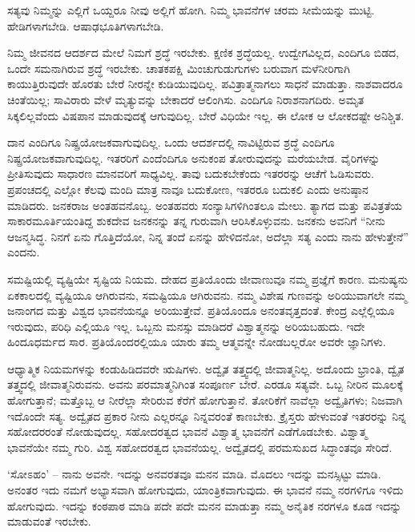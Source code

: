 ಸತ್ಯವು ನಿಮ್ಮನ್ನು ಎಲ್ಲಿಗೆ ಒಯ್ದರೂ ನೀವು ಅಲ್ಲಿಗೆ ಹೋಗಿ. ನಿಮ್ಮ ಭಾವನೆಗಳ ಚರಮ ಸೀಮೆಯನ್ನು ಮುಟ್ಟಿ. ಹೇಡಿಗಳಾಗಬೇಡಿ. ಆಷಾಢಭೂತಿಗಳಾಗಬೇಡಿ.

ನಿಮ್ಮ ಜೀವನದ ಆದರ್ಶದ ಮೇಲೆ ನಿಮಗೆ ಶ್ರದ್ಧೆ ಇರಬೇಕು. ಕ್ಷಣಿಕ ಶ್ರದ್ಧೆಯಲ್ಲ. ಉದ್ವೇಗವಿಲ್ಲದ, ಎಂದಿಗೂ ಬಿಡದ, ಒಂದೇ ಸಮನಾಗಿರುವ ಶ್ರದ್ಧೆ ಇರಬೇಕು. ಚಾತಕಪಕ್ಷಿ ಮಿಂಚುಗುಡುಗುಗಳು ಬರುವಾಗ ಮಳೆನೀರಿಗಾಗಿ ಕಾಯುತ್ತಿರುವುದೇ ಹೊರತು ಬೇರೆ ನೀರನ್ನೇ ಕುಡಿಯುವುದಿಲ್ಲ. ಪವಿತ್ರಾತ್ಮನಾಗಲು ಸಾಧನೆ ಮಾಡುತ್ತಾ. ನಾಶವಾದರೂ ಚಿಂತೆಯಿಲ್ಲ; ಸಾವಿರಾರು ವೇಳೆ ಮೃತ್ಯುವನ್ನು ಬೇಕಾದರೆ ಆಲಿಂಗಿಸು. ಎಂದಿಗೂ ನಿರಾಶನಾಗದಿರು. ಅಮೃತ ಸಿಕ್ಕಲಿಲ್ಲವೆಂದು ವಿಷಪಾನ ಮಾಡುವುದಕ್ಕೆ ಆಗುವುದಿಲ್ಲ. ಬೇರೆ ವಿಧಿಯೇ ಇಲ್ಲ. ಈ ಲೋಕ ಆ ಲೋಕದಷ್ಟೇ ಅನಿಶ್ಚಿತ.

ದಾನ ಎಂದಿಗೂ ನಿಷ್ಪ್ರಯೋಜಕವಾಗುವುದಿಲ್ಲ. ಒಂದು ಆದರ್ಶದಲ್ಲಿ ನಾವಿಟ್ಟಿರುವ ಶ್ರದ್ಧೆ ಎಂದಿಗೂ ನಿಷ್ಪ್ರಯೋಜಕವಾಗುವುದಿಲ್ಲ. ಇತರರಿಗೆ ಎಂದೆಂದಿಗೂ ಅನುಕಂಪ ತೋರುವುದನ್ನು ಮರೆಯಬೇಡ. ವೈರಿಗಳನ್ನು ಪ್ರೀತಿಸುವುದು ಸಾಧಾರಣ ಮಾನವರಿಗೆ ಸಾಧ್ಯವಿಲ್ಲ. ತಾವು ಬದುಕಬೇಕೆಂದು ಇತರರನ್ನು ಆಚೆಗೆ ಓಡಿಸುವರು. ಪ್ರಪಂಚದಲ್ಲಿ ಎಲ್ಲೋ ಕೆಲವು ಮಂದಿ ಮಾತ್ರ ನಾವೂ ಬದುಕೋಣ, ಇತರರೂ ಬದುಕಲಿ ಎಂದು ಅನುಷ್ಠಾನ ಮಾಡಿದರು. ಜನಕರಾಜ ಅಂತಹವನೊಬ್ಬ. ಅಂತಹವರು ಸಂನ್ಯಾಸಿಗಳಿಗಿಂತಲೂ ಮೇಲು. ತ್ಯಾಗದ ಮತ್ತು ಪವಿತ್ರತೆಯ ಸಾಕಾರಮೂರ್ತಿಯಂತಿದ್ದ ಶುಕದೇವ ಜನಕನನ್ನು ತನ್ನ ಗುರುವಾಗಿ ಆರಿಸಿಕೊಳ್ಳುವನು. ಜನಕನು ಅವನಿಗೆ “ನೀನು ಆಜನ್ಮಸಿದ್ಧ. ನಿನಗೆ ಏನು ಗೊತ್ತಿದೆಯೋ, ನಿನ್ನ ತಂದೆ ಏನನ್ನು ಹೇಳಿದನೋ, ಅದೆಲ್ಲಾ ಸತ್ಯ ಎಂದು ನಾನು ಹೇಳುತ್ತೇನೆ” ಎಂದನು.

ಸಮಷ್ಟಿಯಲ್ಲಿ ವ್ಯಷ್ಟಿಯೇ ಸೃಷ್ಟಿಯ ನಿಯಮ. ದೇಹದ ಪ್ರತಿಯೊಂದು ಜೀವಾಣುವೂ  ನಮ್ಮ ಪ್ರಜ್ಞೆಗೆ ಕಾರಣ. ಮನುಷ್ಯನು ಏಕಕಾಲದಲ್ಲಿ ವ್ಯಷ್ಟಿಯೂ ಆಗಿರುವನು, ಸಮಷ್ಟಿಯೂ ಆಗಿರುವನು. ನಮ್ಮ ವಿಶೇಷ ಗುಣವನ್ನು ಅರಿಯುವಾಗಲೇ ನಮ್ಮ ಜನಾಂಗದ ಮತ್ತು ವಿಶ್ವದ ಭಾವನೆಯನ್ನೂ ಅರಿಯುತ್ತೇವೆ. ಪ್ರತಿಯೊಂದೂ ಅನಂತವೃತ್ತದಂತೆ. ಕೇಂದ್ರ ಎಲ್ಲೆಲ್ಲಿಯೂ ಇರುವುದು, ಪರಿಧಿ ಎಲ್ಲಿಯೂ ಇಲ್ಲ. ಒಬ್ಬನು ಮನಸ್ಸು ಮಾಡಿದರೆ ವಿಶ್ವಾತ್ಮನನ್ನು ಅರಿಯಬಹುದು. ಇದೇ ಹಿಂದೂಧರ್ಮದ ಸಾರ. ಪ್ರತಿಯೊಂದರಲ್ಲಿಯೂ ಯಾರು ತಮ್ಮ ಆತ್ಮವನ್ನೇ ನೋಡಬಲ್ಲರೋ ಅವರೇ ಜ್ಞಾನಿಗಳು.

ಆಧ್ಯಾತ್ಮಿಕ ನಿಯಮಗಳನ್ನು ಕಂಡುಹಿಡಿದವರೇ ಋಷಿಗಳು. ಅದ್ವೈತ ತತ್ತ್ವದಲ್ಲಿ ಜೀವಾತ್ಮನಿಲ್ಲ. ಅದೊಂದು ಭ್ರಾಂತಿ, ದ್ವೈತ ತತ್ತ್ವದಲ್ಲಿ ಜೀವಾತ್ಮನಿರುವನು. ಅವನು ಪರಮಾತ್ಮನಿಗಿಂತ ಸಂಪೂರ್ಣ ಬೇರೆ. ಎರಡೂ ಸತ್ಯವೇ. ಒಬ್ಬ ನೀರಿನ ಮೂಲಕ್ಕೆ ಹೋಗುತ್ತಾನೆ; ಮತ್ತೊಬ್ಬ ಆ ನೀರೆಲ್ಲಾ ಸೇರಿರುವ ಕೆರೆಗೆ ಹೋಗುತ್ತಾನೆ. ತೋರಿಕೆಗೆ ನಾವೆಲ್ಲಾ ಅದ್ವೈತಿಗಳು; ನಿಜವಾಗಿ ಇದೊಂದೇ ಸತ್ಯ. ಅದ್ವೈತದ ಪ್ರಕಾರ ನೀನು ಎಲ್ಲರನ್ನೂ ನಿನ್ನವರಂತೆ ಕಾಣಬೇಕು. ಕ್ರೈಸ್ತರು ಹೇಳುವಂತೆ ಇತರರನ್ನು ನಿನ್ನ ಸಹೋದರರಂತೆ ನೋಡುವುದಲ್ಲ. ಸಹೋದರತ್ವದ ಭಾವನೆ ವಿಶ್ವಾತ್ಮ ಭಾವನೆಗೆ ಎಡೆಗೊಡಬೇಕು. ವಿಶ್ವಾತ್ಮ ಭಾವನೆಯೇ ನಮ್ಮ ಗುರಿ. ವಿಶ್ವ ಸಹೋದರತ್ವದ ಭಾವನೆಯಲ್ಲ. ಅದ್ವೈತದಲ್ಲಿ ಪರಮಸುಖದ ಸಿದ್ಧಾಂತವೂ ಸೇರಿದೆ.

‘ಸೋಽಹಂ’ – ನಾನು ಅವನೇ. ಇದನ್ನು ಅನವರತವೂ ಮನನ ಮಾಡಿ. ಮೊದಲು ಇದನ್ನು ಮನಸ್ಸಿಟ್ಟು ಮಾಡಿ. ಅನಂತರ ಇದು ನಮಗೆ ಅಭ್ಯಾಸವಾಗಿ ಹೋಗುವುದು, ಯಾಂತ್ರಿಕವಾಗುವುದು. ಈ ಭಾವನೆ ನಮ್ಮ ನರಗಳಿಗೂ ಇಳಿದು ಹೋಗುವುದು. ಇದನ್ನು ಕಂಠಪಾಠ ಮಾಡಿ ಪದೇ ಪದೇ ಮನನ ಮಾಡುತ್ತಾ ನಮ್ಮ ಅನೈತಿಕ ನರಗಳೂ ಕೂಡ ಇದನ್ನು ಮಾಡುವಂತೆ ಇರಬೇಕು.

